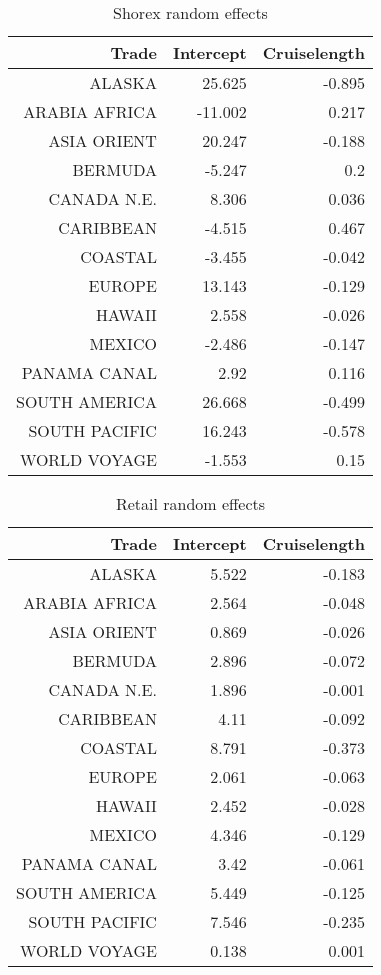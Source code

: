 \documentclass{article}
\begin{document}
\begin{table}[H]
	\centering 
\begin{tabular}{rrr}
	Trade & Intercept & Cruiselength \\ 
	\hline 
	\hline 
	ALASKA & 25.625 & -0.895 \\
	ARABIA  AFRICA & -11.002 & 0.217 \\
	ASIA ORIENT & 20.247 & -0.188 \\
	BERMUDA & -5.247 & 0.2 \\
	CANADA N.E. & 8.306 & 0.036 \\
	CARIBBEAN & -4.515 & 0.467 \\
	COASTAL & -3.455 & -0.042 \\
	EUROPE & 13.143 & -0.129 \\
	HAWAII & 2.558 & -0.026 \\
	MEXICO & -2.486 & -0.147 \\
	PANAMA CANAL & 2.92 & 0.116 \\
	SOUTH AMERICA & 26.668 & -0.499 \\
	SOUTH PACIFIC & 16.243 & -0.578 \\
	WORLD VOYAGE & -1.553 & 0.15 \\
	\hline 
	\hline 
\end{tabular}
\caption{Shorex random effects}
\end{table}

	\begin{table}[H]\centering
\begin{tabular}{rrr}
		Trade & Intercept & Cruiselength \\ 
		\hline 
		\hline 
	ALASKA & 5.522 & -0.183 \\
	ARABIA AFRICA & 2.564 & -0.048 \\
	ASIA ORIENT & 0.869 & -0.026 \\
	BERMUDA & 2.896 & -0.072 \\
	CANADA N.E. & 1.896 & -0.001 \\
	CARIBBEAN & 4.11 & -0.092 \\
	COASTAL & 8.791 & -0.373 \\
	EUROPE & 2.061 & -0.063 \\
	HAWAII & 2.452 & -0.028 \\
	MEXICO & 4.346 & -0.129 \\
	PANAMA CANAL & 3.42 & -0.061 \\
	SOUTH AMERICA & 5.449 & -0.125 \\
	SOUTH PACIFIC & 7.546 & -0.235 \\
	WORLD VOYAGE &0.138 & 0.001 \\
		\hline 
		\hline 
\end{tabular}
		\caption{Retail random effects}
	\end{table}
	
\end{document}
